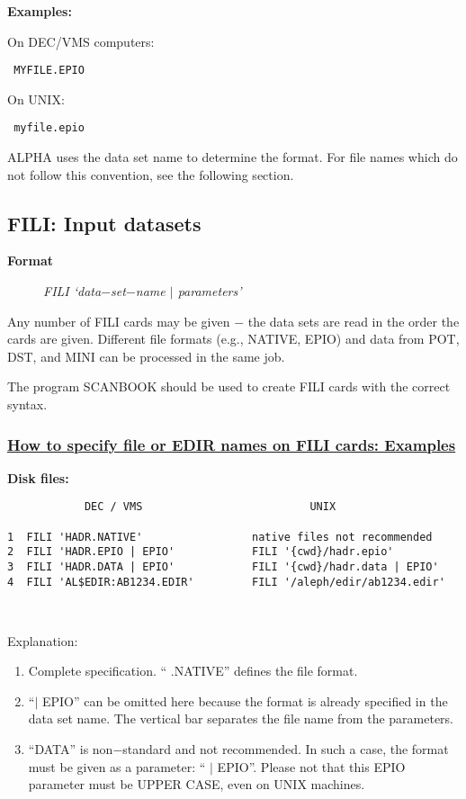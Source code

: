 {\bf Examples:}
 
\noindent On DEC/VMS computers:\begin{verbatim} MYFILE.EPIO\end{verbatim}
\noindent On UNIX:\begin{verbatim} myfile.epio\end{verbatim}
 
\par ALPHA uses the data set name to determine the format.
For file names which do not follow this convention,
see the following section.
\par
\subsection{\label{sec-DCFILI}FILI: Input datasets}
\par
\par
\begin{description}\item[\bf{Format}]{\it FILI `data$-$set$-$name
$\mid$ parameters'}\end{description}
 
Any number of FILI cards may be given $-$ the data sets are read in
the
order the cards are given. Different file formats (e.g., NATIVE, EPIO)
and data from POT, DST,
and MINI can be processed in the same job.

The program SCANBOOK should be
used to create FILI cards with the correct syntax.
\subsubsection{\underline{How to specify file or EDIR names on FILI cards: Examples}}
\par
{\bf Disk files:}
\begin{verbatim}
            DEC / VMS                          UNIX
 
1  FILI 'HADR.NATIVE'                 native files not recommended
2  FILI 'HADR.EPIO | EPIO'            FILI '{cwd}/hadr.epio'
3  FILI 'HADR.DATA | EPIO'            FILI '{cwd}/hadr.data | EPIO'
4  FILI 'AL$EDIR:AB1234.EDIR'         FILI '/aleph/edir/ab1234.edir'
 
 
\end{verbatim}
\newpage
Explanation:
\begin{enumerate}
\item Complete specification. `` .NATIVE'' defines the file
format.
\item ``$\mid$ EPIO'' can be omitted here because the format is
already
specified in the data set name. The vertical bar separates the file
name from the parameters.
\item ``DATA'' is non$-$standard and not recommended. In such a case,
the format must be given as a parameter: `` $\mid$ EPIO''. Please not that this EPIO parameter must be UPPER CASE,
even on UNIX machines.
\end{enumerate}
\par
